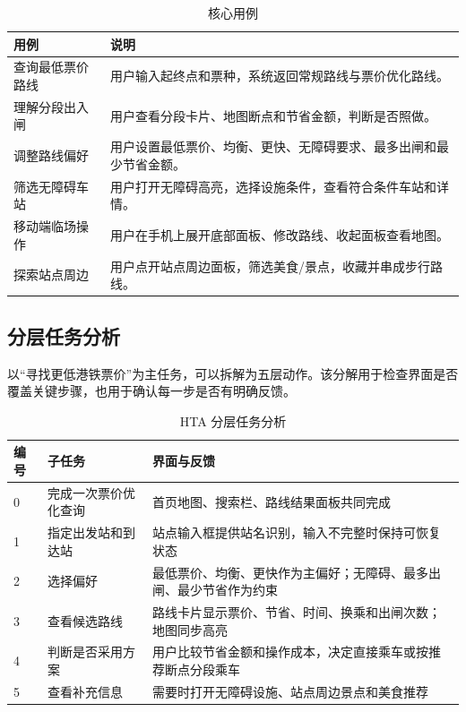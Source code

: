 \documentclass[UTF8,a4paper,11pt]{ctexart}
\begin{document}
\begin{table}[H]
  \centering
  \caption{核心用例}
  \begin{tabularx}{\textwidth}{lY}
    \toprule
    用例 & 说明 \\
    \midrule
    查询最低票价路线 & 用户输入起终点和票种，系统返回常规路线与票价优化路线。 \\
    理解分段出入闸 & 用户查看分段卡片、地图断点和节省金额，判断是否照做。 \\
    调整路线偏好 & 用户设置最低票价、均衡、更快、无障碍要求、最多出闸和最少节省金额。 \\
    筛选无障碍车站 & 用户打开无障碍高亮，选择设施条件，查看符合条件车站和详情。 \\
    移动端临场操作 & 用户在手机上展开底部面板、修改路线、收起面板查看地图。 \\
    探索站点周边 & 用户点开站点周边面板，筛选美食/景点，收藏并串成步行路线。 \\
    \bottomrule
  \end{tabularx}
\end{table}

\subsection{分层任务分析}

以“寻找更低港铁票价”为主任务，可以拆解为五层动作。该分解用于检查界面是否覆盖关键步骤，也用于确认每一步是否有明确反馈。

\begin{table}[H]
  \centering
  \caption{HTA 分层任务分析}
  \begin{tabularx}{\textwidth}{p{}YY}
    \toprule
    编号 & 子任务 & 界面与反馈 \\
     & 完成一次票价优化查询 & 首页地图、搜索栏、路线结果面板共同完成 \\
    1 & 指定出发站和到达站 & 站点输入框提供站名识别，输入不完整时保持可恢复状态 \\
    2 & 选择偏好 & 最低票价、均衡、更快作为主偏好；无障碍、最多出闸、最少节省作为约束 \\
    3 & 查看候选路线 & 路线卡片显示票价、节省、时间、换乘和出闸次数；地图同步高亮 \\
    4 & 判断是否采用方案 & 用户比较节省金额和操作成本，决定直接乘车或按推荐断点分段乘车 \\
    5 & 查看补充信息 & 需要时打开无障碍设施、站点周边景点和美食推荐 \\
    \bottomrule
  \end{tabularx}
\end{table}
\end{document}
